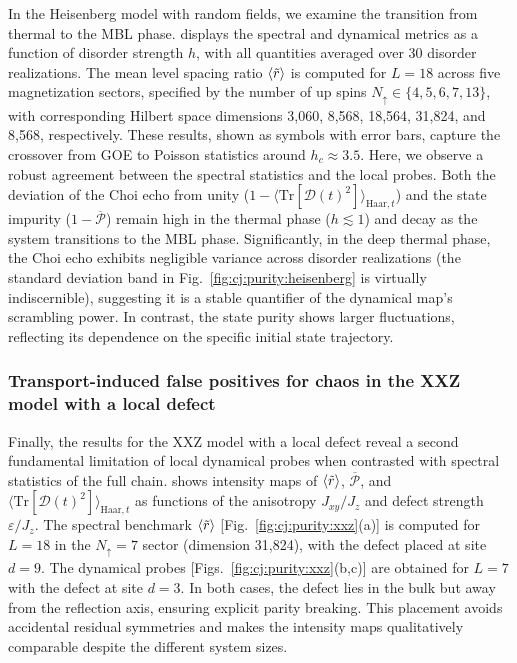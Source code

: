 \documentclass[pra,twocolumn,aps,showpacs,superscriptaddress,longbibliography]{revtex4-2}
\newcommand{\choip}{\langle \text{Tr}[\mathcal{D}(t)^2] \rangle_{\mathrm{Haar}, t}}
\newcommand{\statep}{\overline{\mathcal{P}}}
\newcommand{\mlsr}{\ev{\tilde{r}}}
\begin{document}
In the Heisenberg model with random fields, we examine the transition from thermal to the MBL phase.  displays the spectral and dynamical metrics as a function of disorder strength $h$, with all quantities averaged over 30 disorder realizations. The mean level spacing ratio $\mlsr$ is computed for $L=18$ across five magnetization sectors, specified by the number of up spins $N_{\uparrow} \in \{4, 5, 6, 7, 13\}$, with corresponding Hilbert space dimensions 3,060, 8,568, 18,564, 31,824, and 8,568, respectively. These results, shown as symbols with error bars, capture the crossover from GOE to Poisson statistics around $h_c \approx 3.5$. Here, we observe a robust agreement between the spectral statistics and the local probes. Both the deviation of the Choi echo from unity ($1-\choip$) and the state impurity ($1-\statep$) remain high in the thermal phase ($h \lesssim 1$) and decay as the system transitions to the MBL phase. Significantly, in the deep thermal phase, the Choi echo exhibits negligible variance across disorder realizations (the standard deviation band in Fig.~\ref{fig:cj:purity:heisenberg} is virtually indiscernible), suggesting it is a stable quantifier of the dynamical map's scrambling power. In contrast, the state purity shows larger fluctuations, reflecting its dependence on the specific initial state trajectory.

\subsubsection{Transport-induced false positives for chaos in the XXZ model with a local defect}\label{sec:results_xxz}

Finally, the results for the XXZ model with a local defect reveal a second fundamental limitation of local dynamical probes when contrasted with spectral statistics of the full chain.  shows intensity maps of $\mlsr$, $\statep$, and $\choip$ as functions of the anisotropy $J_{xy}/J_z$ and defect strength $\varepsilon/J_z$. The spectral benchmark $\mlsr$ [Fig.~\ref{fig:cj:purity:xxz}(a)] is computed for $L=18$ in the $N_{\uparrow}=7$ sector (dimension 31,824), with the defect placed at site $d=9$. The dynamical probes [Figs.~\ref{fig:cj:purity:xxz}(b,c)] are obtained for $L=7$ with the defect at site $d=3$. In both cases, the defect lies in the bulk but away from the reflection axis, ensuring explicit parity breaking. This placement avoids accidental residual symmetries and makes the intensity maps qualitatively comparable despite the different system sizes.
\end{document}
